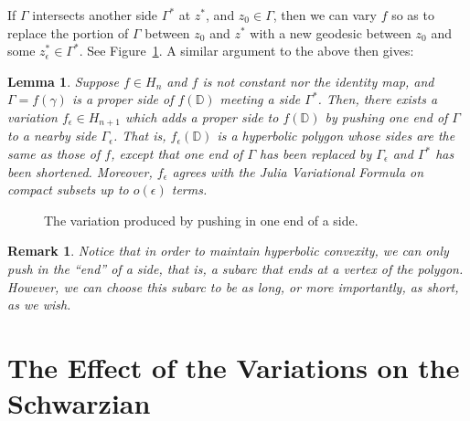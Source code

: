 \documentclass{lms}
\newcommand{\D}{\mathbb D}
\newcommand{\norm}[1]{\lvert\lvert#1\rvert\rvert}
\newcommand{\Snf}{\norm{S_f}_\D}
\newtheorem{lemma}[theorem]{Lemma}
\newtheorem{remark}[theorem]{Remark}
\numberwithin{equation}{section}
\begin{document}
If $\Gamma$ intersects another side $\Gamma^*$ at $z^*$, 
 and $z_0\in\Gamma$,  
then we can vary $f$ so as to replace
the portion of $\Gamma$ between $z_0$ and $z^*$ with a new geodesic between
$z_0$ and some $z^*_\epsilon\in\Gamma^*$.  See Figure~\ref{F:kick-in}.
A similar argument to the above then gives: 


\begin{lemma} \label{L:kick-in}
Suppose $f\in H_n$ and $f$ is not constant nor the identity map,
and $\Gamma=f(\gamma)$ is a proper side of $f(\D)$ meeting a side $\Gamma^*$.
Then, there exists a variation $f_\epsilon\in H_{n+1}$ which 
adds a proper side to $f(\D)$ by pushing one end of $\Gamma$ to
 a nearby side $\Gamma_\epsilon$.  That is, $f_\epsilon(\D)$ 
is a hyperbolic polygon whose sides are the same as those of $f$, except that
one end of $\Gamma$ has been replaced by $\Gamma_\epsilon$ and $\Gamma^*$
has been shortened.
Moreover, $f_\epsilon$ agrees with the Julia Variational Formula on compact
subsets up to
$o(\epsilon)$ terms.
\end{lemma}


\begin{figure}
\begin{center}
\caption{The variation produced by pushing in one end of a side.}
\label{F:kick-in}
\end{center}
\end{figure}

\begin{remark}\label{R:end}
Notice that in order to maintain hyperbolic convexity, we can only push in 
the ``end'' of a side, that is, a subarc that ends at a vertex of the
polygon.  However, we can choose this  subarc to be as long, or
more importantly, as short, as we wish.  
\end{remark}


\section{The Effect of the Variations on the Schwarzian}\label{S:effect}

\end{document}

